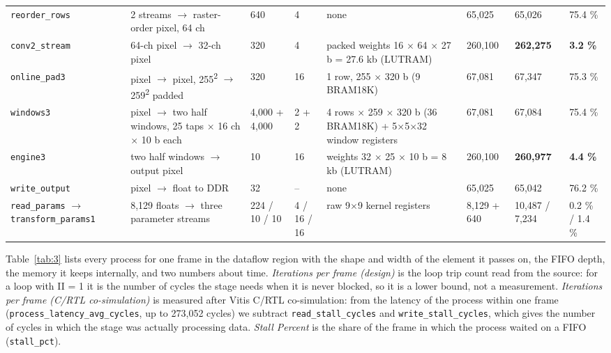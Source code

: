 \begin{table}[!htbp]
\begin{tabularx}{\linewidth}{lYR{0.9cm}R{1.3cm}YR{1.4cm}R{1.6cm}R{1.0cm}}
\texttt{reorder\_rows} & 2 streams $\rightarrow$ raster-order pixel, 64 ch & 640 & 4 & none & 65,025 & 65,026 & 75.4 \% \\
\texttt{conv2\_stream} & 64-ch pixel $\rightarrow$ 32-ch pixel & 320 & 4 & packed weights 16 $\times$ 64 $\times$ 27 b = 27.6 kb (LUTRAM) & 260,100 & \textbf{262,275} & \textbf{3.2 \%} \\
\texttt{online\_pad3} & pixel $\rightarrow$ pixel, 255\textsuperscript{2} $\rightarrow$ 259\textsuperscript{2} padded & 320 & 16 & 1 row, 255 $\times$ 320 b (9 BRAM18K) & 67,081 & 67,347 & 75.3 \% \\
\texttt{windows3} & pixel $\rightarrow$ two half windows, 25 taps $\times$ 16 ch $\times$ 10 b each & 4,000 + 4,000 & 2 + 2 & 4 rows $\times$ 259 $\times$ 320 b (36 BRAM18K) + 5$\times$5$\times$32 window registers & 67,081 & 67,084 & 75.4 \% \\
\texttt{engine3} & two half windows $\rightarrow$ output pixel & 10 & 16 & weights 32 $\times$ 25 $\times$ 10 b = 8 kb (LUTRAM) & 260,100 & \textbf{260,977} & \textbf{4.4 \%} \\
\texttt{write\_output} & pixel $\rightarrow$ float to DDR & 32 & -- & none & 65,025 & 65,042 & 76.2 \% \\
\texttt{read\_params} $\rightarrow$ \texttt{transform\_params1} & 8,129 floats $\rightarrow$ three parameter streams & 224 / 10 / 10 & 4 / 16 / 16 & raw 9$\times$9 kernel registers & 8,129 + 640 & 10,487 / 7,234 & 0.2 \% / 1.4 \% \\
\bottomrule
\end{tabularx}
\end{table}

Table~\ref{tab:3} lists every process for one frame in the dataflow region with the shape and width of the element it passes on, the FIFO depth, the memory it keeps internally, and two numbers about time. \emph{Iterations per frame (design)} is the loop trip count read from the source: for a loop with II = 1 it is the number of cycles the stage needs when it is never blocked, so it is a lower bound, not a measurement. \emph{Iterations per frame (C/RTL co-simulation)} is measured after Vitis C/RTL co-simulation: from the latency of the process within one frame (\texttt{process\_latency\_avg\_cycles}, up to 273,052 cycles) we subtract \texttt{read\_stall\_cycles} and \texttt{write\_stall\_cycles}, which gives the number of cycles in which the stage was actually processing data. \emph{Stall Percent} is the share of the frame in which the process waited on a FIFO (\texttt{stall\_pct}).

